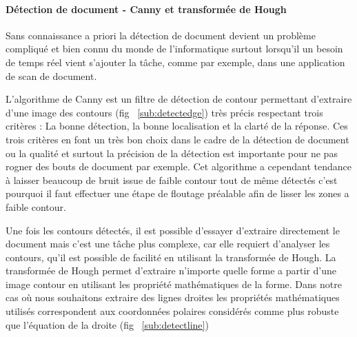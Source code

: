 \paragraph{Détection de document - Canny et transformée de Hough} Sans connaissance a priori la détection de document devient un problème compliqué et bien connu du monde de l'informatique surtout lorsqu'il un besoin de temps réel vient s'ajouter la tâche, comme par exemple, dans une application de scan de document.

L'algorithme de Canny\cite{Canny86acomputational} est un filtre de détection de contour permettant d'extraire d'une image des contours (fig ~\ref{sub:detectedge}) très précis respectant trois critères : La bonne détection, la bonne localisation et la clarté de la réponse. Ces trois critères en font un très bon choix dans le cadre de la détection de document ou la qualité et surtout la précision de la détection est importante pour ne pas rogner des bouts de document par exemple. Cet algorithme a cependant tendance à laisser beaucoup de bruit issue de faible contour tout de même détectés c'est pourquoi il faut effectuer une étape de floutage préalable afin de lisser les zones a faible contour.

Une fois les contours détectés, il est possible d'essayer d'extraire directement le document mais c'est une tâche plus complexe, car elle requiert d'analyser les contours, qu'il est possible de facilité en utilisant la transformée de Hough\cite{hough}. La transformée de Hough permet d'extraire n'importe quelle forme a partir d'une image contour en utilisant les propriété mathématiques de la forme. Dans notre cas où nous souhaitons extraire des lignes droites les propriétés mathématiques utilisés correspondent aux coordonnées polaires considérés comme plus robuste que l’équation de la droite (fig ~\ref{sub:detectline})

